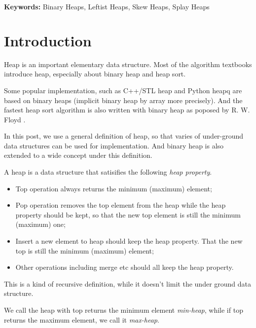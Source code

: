 \documentclass{article}
\begin{document}
\vspace{3cm}
{\bfseries Keywords:} Binary Heaps, Leftist Heaps, Skew Heaps, Splay Heaps


\maketitle

\section{Introduction}
\label{introduction}

Heap is an important elementary data structure. Most of the algorithm
textbooks introduce heap, especially about binary heap and heap sort.

Some popular implementation, such as C++/STL heap and Python heapq
are based on binary heaps (implicit binary heap by array
more precisely). And the fastest heap sort algorithm is also
written with binary heap as poposed by R. W. Floyd
\cite{wiki-heapsort} \cite{rosetta-heapsort}.

In this post, we use a general definition of heap, so that
varies of under-ground data structures can be used for implementation.
And binary heap is also extended to a wide concept under this definition.

A heap is a data structure that satisifies the following {\em heap property}.
\begin{itemize}
\item Top operation always returns the minimum (maximum) element;
\item Pop operation removes the top element from the heap while the heap
property should be kept, so that the new top element is still the 
minimum (maximum) one;
\item Insert a new element to heap should keep the heap property. That
the new top is still the minimum (maximum) element;
\item Other operations including merge etc should all keep the heap property.
\end{itemize}

This is a kind of recursive definition, while it doesn't limit the under
ground data structure.

We call the heap with top returns the minimum element {\em min-heap},
while if top returns the maximum element, we call it {\em max-heap}.
\end{document}
